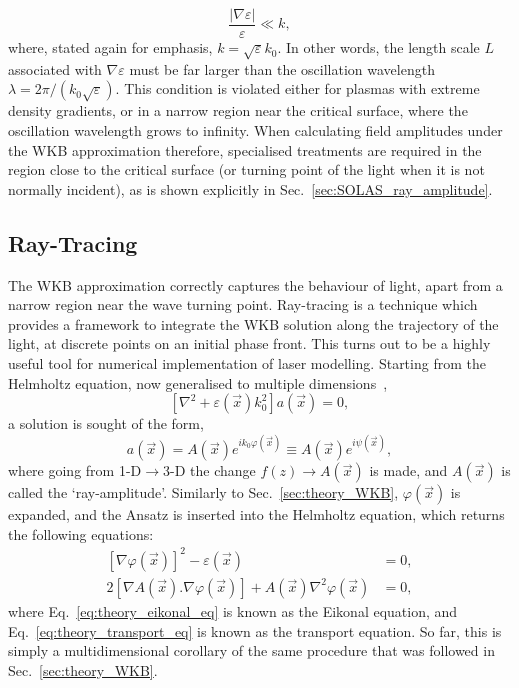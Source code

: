 \begin{equation}
    \frac{|\nabla \varepsilon|}{\varepsilon} \ll k,
\end{equation}
where, stated again for emphasis, $k=\sqrt{\varepsilon}k_0$.
In other words, the length scale $L$ associated with $\nabla\varepsilon$ must be far larger than the oscillation wavelength $\lambda = 2\pi/(k_0\sqrt{\varepsilon})$.
This condition is violated either for plasmas with extreme density gradients, or in a narrow region near the critical surface, where the oscillation wavelength grows to infinity.
When calculating field amplitudes under the WKB approximation therefore, specialised treatments are required in the region close to the critical surface (or turning point of the light when it is not normally incident), as is shown explicitly in Sec.~\ref{sec:SOLAS_ray_amplitude}.

\subsection{Ray-Tracing}%
\label{sec:theory_rays}

The WKB approximation correctly captures the behaviour of light, apart from a narrow region near the wave turning point.
Ray-tracing is a technique which provides a framework to integrate the WKB solution along the trajectory of the light, at discrete points on an initial phase front.
This turns out to be a highly useful tool for numerical implementation of laser modelling.
Starting from the Helmholtz equation, now generalised to multiple dimensions~\cite{colaitis_modeling_2014},
\begin{equation}
    \left[ \nabla^2 + \varepsilon(\vec{x})k_0^2 \right] a(\vec{x}) = 0,
\end{equation}
a solution is sought of the form,
\begin{equation}
    a(\vec{x}) = A(\vec{x}) e^{i k_0 \varphi(\vec{x})} \equiv A(\vec{x}) e^{i \psi(\vec{x})},
\end{equation}
where going from 1-D$\rightarrow$3-D the change $f(z)\rightarrow A(\vec{x})$ is made, and $A(\vec{x})$ is called the `ray-amplitude'.
Similarly to Sec.~\ref{sec:theory_WKB}, $\varphi(\vec{x})$ is expanded, and the Ansatz is inserted into the Helmholtz equation, which returns the following equations:
\begin{align}
    \label{eq:theory_eikonal_eq}
    \left[\nabla \varphi(\vec{x})\right]^2  - \varepsilon(\vec{x}) &= 0,\\
    \label{eq:theory_transport_eq}
    2\left[\nabla A(\vec{x}) . \nabla \varphi (\vec{x}) \right] + A(\vec{x}) \nabla^2 \varphi(\vec{x}) &= 0,
\end{align}
where Eq.~\ref{eq:theory_eikonal_eq} is known as the Eikonal equation, and Eq.~\ref{eq:theory_transport_eq} is known as the transport equation.
So far, this is simply a multidimensional corollary of the same procedure that was followed in Sec.~\ref{sec:theory_WKB}.

